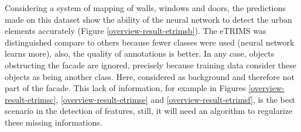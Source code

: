 Considering a system of mapping of walls, windows and doors, the predictions made on this dataset show the ability of the neural network to detect the urban elements accurately (Figure \ref{overview-result-etrimsb}). The eTRIMS was distinguished compare to others because fewer classes were used (neural network learns more), also, the quality of annotations is better. In any case, objects obstructing the facade are ignored, precisely because training data consider these objects as being another class. Here, considered as background and therefore not part of the facade. This lack of information, for example in Figures \ref{overview-result-etrimsc}, \ref{overview-result-etrimse} and \ref{overview-result-etrimsf}, is the best scenario in the detection of features, still, it will need an algorithm to regularize these missing informations.

